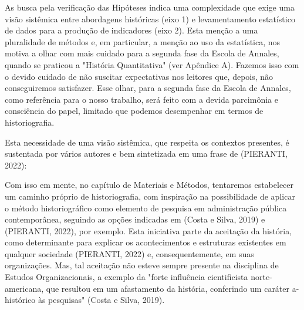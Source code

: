 \noindent\begin{center}\mbox{\centering{}}\end{center}


As busca pela verificação das Hipóteses indica uma complexidade que exige uma visão sistêmica entre abordagens históricas (eixo 1) e levamentamento estatístico de dados para a produção de indicadores (eixo 2). Esta menção a uma pluralidade de métodos e, em particular, a menção ao uso da estatística, nos motiva a olhar com mais cuidado para a segunda fase da Escola de Annales, quando se praticou a "História Quantitativa" (ver Apêndice A). Fazemos isso com o devido cuidado de não suscitar expectativas nos leitores que, depois, não conseguiremos satisfazer. Esse olhar, para a segunda fase da Escola de Annales, como referência para o nosso trabalho, será feito com a devida parcimônia e consciência do papel, limitado que podemos desempenhar em termos de historiografia.

Esta necessidade de uma visão sistêmica, que respeita os contextos presentes, é sustentada por vários autores e bem sintetizada em uma frase de (PIERANTI, 2022):


\noindent\begin{center}\mbox{\centering{}}\end{center}


Com isso em mente, no capítulo de Materiais e Métodos, tentaremos estabelecer um caminho próprio de historiografia, com inspiração na possibilidade de aplicar o método historiográfico como elemento de pesquisa em administração pública contemporânea, seguindo as opções indicadas em  (Costa e Silva, 2019) e (PIERANTI, 2022), por exemplo. Esta iniciativa parte da aceitação da história, como determinante para explicar os acontecimentos e estruturas existentes em qualquer sociedade (PIERANTI, 2022) e, consequentemente, em suas organizações. Mas, tal aceitação não esteve sempre presente na disciplina de Estudos Organizacionais, a exemplo da "forte influência cientificista norte-americana, que resultou em um afastamento da história, conferindo um caráter a-histórico às pesquisas" (Costa e Silva, 2019).

